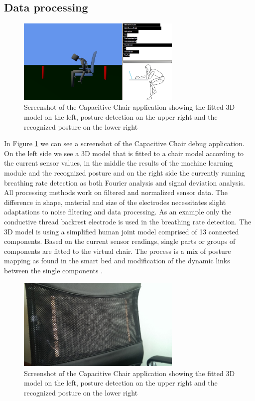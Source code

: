 \subsection{Data processing}
\begin{figure}[h]
\centering
\includegraphics[width=0.7\textwidth]{images/smartchair_software}
\caption{Screenshot of the Capacitive Chair application showing the fitted 3D model on the left, posture detection on the upper right and the recognized posture on the lower right}
\label{fig:smartchair_software}
\end{figure}
In Figure \ref{fig:smartchair_software} we can see a screenshot of the Capacitive Chair debug application. On the left side we see a 3D model that is fitted to a chair model according to the current sensor values, in the middle the results of the machine learning module and the recognized posture and on the right side the currently running breathing rate detection as both Fourier analysis and signal deviation analysis.
All processing methods work on filtered and normalized sensor data. The difference in shape, material and size of the electrodes necessitates slight adaptations to noise filtering and data processing. As an example only the conductive thread backrest electrode is used in the breathing rate detection. 
The 3D model is using a simplified human joint model comprised of 13 connected components. Based on the current sensor readings, single parts or groups of components are fitted to the virtual chair. The process is a mix of posture mapping as found in the smart bed and modification of the dynamic links between the single components \cite{Braun2013ChairAid}.
\begin{figure}[h]
\centering
\includegraphics[width=0.7\textwidth]{images/smartchair_thread}
\caption{Screenshot of the Capacitive Chair application showing the fitted 3D model on the left, posture detection on the upper right and the recognized posture on the lower right}
\label{fig:smartchair_thread}
\end{figure}
